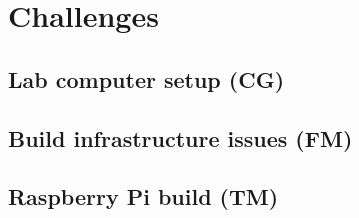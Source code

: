 \section{Challenges}
\label{sec:challenges}


\subsection{Lab computer setup (CG)}


\subsection{Build infrastructure issues (FM)}


\subsection{Raspberry Pi build (TM)}
